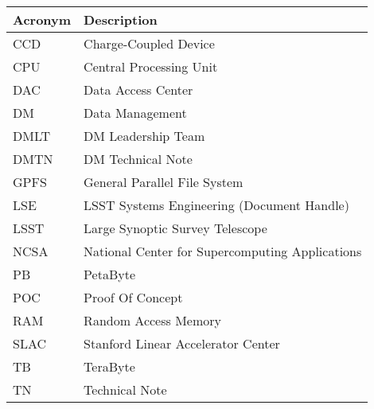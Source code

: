 \addtocounter{table}{-1}
\begin{longtable}{|l|p{}|}\hline
\textbf{Acronym} & \textbf{Description}  \\\hline

CCD&Charge-Coupled Device \\\hline
CPU&Central Processing Unit \\\hline
DAC&Data Access Center \\\hline
DM&Data Management \\\hline
DMLT&DM Leadership Team \\\hline
DMTN&DM Technical Note \\\hline
GPFS&General Parallel File System \\\hline
LSE&LSST Systems Engineering (Document Handle) \\\hline
LSST&Large Synoptic Survey Telescope \\\hline
NCSA&National Center for Supercomputing Applications \\\hline
PB&PetaByte \\\hline
POC&Proof Of Concept \\\hline
RAM&Random Access Memory \\\hline
SLAC&Stanford Linear Accelerator Center \\\hline
TB&TeraByte \\\hline
TN&Technical Note \\\hline
\end{longtable}
